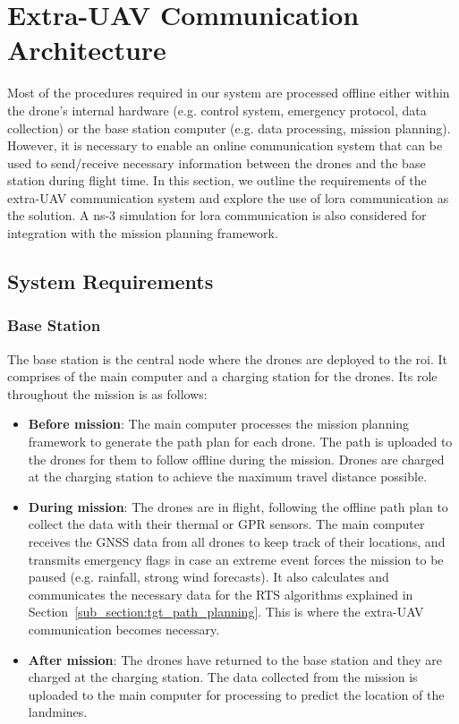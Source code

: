 \newpage
{}
\section{Extra-UAV Communication Architecture} \label{sec:euc}

Most of the procedures required in our system are processed offline either within the drone's internal hardware (e.g. control system, emergency protocol, data collection) or the base station computer (e.g. data processing, mission planning). However, it is necessary to enable an online communication system that can be used to send/receive necessary information between the drones and the base station during flight time. In this section, we outline the requirements of the extra-\gls{UAV} communication system and explore the use of \gls{lora} communication as the solution. A ns-3 simulation for \gls{lora} communication is also considered for integration with the mission planning framework. 

\subsection{System Requirements}
\label{sec:euc_requirements}

\subsubsection{Base Station}

The base station is the central node where the drones are deployed to the \gls{roi}. It comprises of the main computer and a charging station for the drones. Its role throughout the mission is as follows:

\begin{itemize}
    \item \textbf{Before mission}: The main computer processes the mission planning framework to generate the path plan for each drone. The path is uploaded to the drones for them to follow offline during the mission. Drones are charged at the charging station to achieve the maximum travel distance possible. 
    \item \textbf{During mission}: The drones are in flight, following the offline path plan to collect the data with their thermal or \gls{GPR} sensors. The main computer receives the \gls{GNSS} data from all drones to keep track of their locations, and transmits emergency flags in case an extreme event forces the mission to be paused (e.g. rainfall, strong wind forecasts). It also calculates and communicates the necessary data for the \gls{RTS} algorithms explained in Section~\ref{sub_section:tgt_path_planning}. This is where the extra-\gls{UAV} communication becomes necessary. 
    \item \textbf{After mission}: The drones have returned to the base station and they are charged at the charging station. The data collected from the mission is uploaded to the main computer for processing to predict the location of the landmines. 
\end{itemize}

